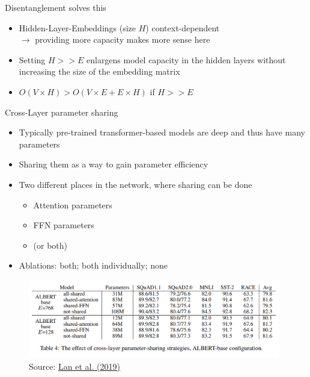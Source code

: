 
\begin{frame}{Disentanglement solves this}

\vfill

	\begin{itemize}
		\item Hidden-Layer-Embeddings (size $H$) context-dependent\\
					$\to$ providing more capacity makes more sense here
		\item Setting $H >> E$ enlargens model capacity in the hidden layers without increasing the size of the embedding matrix
		\item $O(V \times H) > O(V \times E +  E \times H)$ if $H >> E$
\end{itemize}

\vfill

\end{frame}


\begin{frame}{Cross-Layer parameter sharing}

\vfill

	\begin{itemize}
		\item Typically pre-trained transformer-based models are deep and thus have many parameters
		\item Sharing them as a way to gain parameter efficiency
		\item Two different places in the network, where sharing can be done
			\begin{itemize}
				\item Attention parameters
				\item FFN parameters
				\item (or both)
			\end{itemize}
		\item Ablations: both; both individually; none
	\end{itemize}

	\begin{figure}
		\centering
		\includegraphics[width = 11cm]{figure/albert-param-sharing.png}\\ 
		\footnotesize{Source:} \href{https://arxiv.org/pdf/1909.11942.pdf}{\footnotesize Lan et al. (2019)}
	\end{figure}

\vfill

\end{frame}


